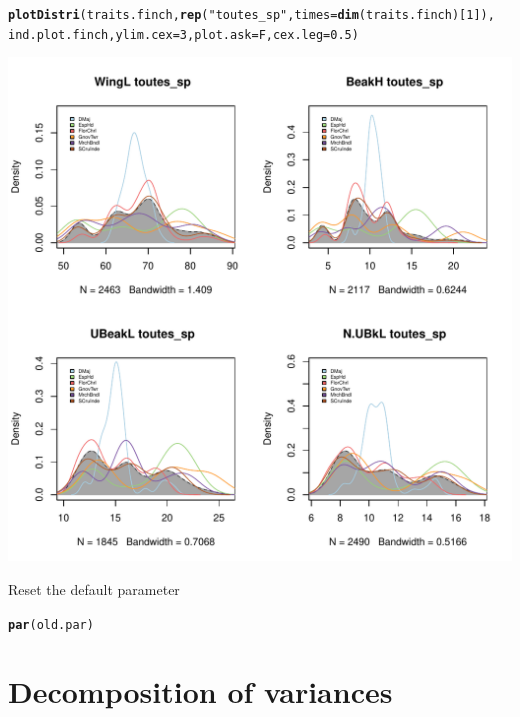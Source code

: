 \documentclass[12pt]{article}\usepackage[]{graphicx}\usepackage[]{color}
\makeatletter
\def\maxwidth{ %
  \ifdim\Gin@nat@width>\linewidth
    \linewidth
  \else
    \Gin@nat@width
  \fi
}
\newcommand{\hlnum}[1]{\textcolor[rgb]{0.686,0.059,0.569}{#1}}%
\newcommand{\hlstr}[1]{\textcolor[rgb]{0.192,0.494,0.8}{#1}}%
\newcommand{\hlstd}[1]{\textcolor[rgb]{0.345,0.345,0.345}{#1}}%
\newcommand{\hlkwc}[1]{\textcolor[rgb]{0.333,0.667,0.333}{#1}}%
\newcommand{\hlkwd}[1]{\textcolor[rgb]{0.737,0.353,0.396}{\textbf{#1}}}%
\newenvironment{kframe}{%
 \def\at@end@of@kframe{}%
 \ifinner\ifhmode%
  \def\at@end@of@kframe{\end{minipage}}%
  \begin{minipage}{\columnwidth}%
 \fi\fi%
 \def\FrameCommand##1{\hskip\@totalleftmargin \hskip-\fboxsep
 \colorbox{shadecolor}{##1}\hskip-\fboxsep
     \hskip-\linewidth \hskip-\@totalleftmargin \hskip\columnwidth}%
 \MakeFramed {\advance\hsize-\width
   \@totalleftmargin\z@ \linewidth\hsize
   \@setminipage}}%
 {\par\unskip\endMakeFramed%
 \at@end@of@kframe}
\newenvironment{knitrout}{}{} %
\makeatother
\begin{document}
\begin{knitrout}
\color{fgcolor}\begin{kframe}
\begin{alltt}
\hlkwd{plotDistri}\hlstd{(traits.finch,} \hlkwd{rep}\hlstd{(}\hlstr{"toutes_sp"}\hlstd{,} \hlkwc{times}\hlstd{=}\hlkwd{dim}\hlstd{(traits.finch)[}\hlnum{1}\hlstd{]),}
          \hlstd{ind.plot.finch,} \hlkwc{ylim.cex}\hlstd{=}\hlnum{3}\hlstd{,} \hlkwc{plot.ask}\hlstd{=F,} \hlkwc{cex.leg}\hlstd{=}\hlnum{0.5}\hlstd{)}
\end{alltt}
\end{kframe}
\includegraphics[width=\maxwidth]{figure/unnamed-chunk-14} 

\end{knitrout}

Reset the default parameter
\begin{knitrout}
\color{fgcolor}\begin{kframe}
\begin{alltt}
\hlkwd{par}\hlstd{(old.par)}
\end{alltt}
\end{kframe}
\end{knitrout}
\newpage

\section{Decomposition of variances}
\end{document}
